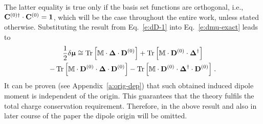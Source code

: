 \documentclass[aip,amsmath,amssymb,reprint,floatfix]{revtex4-1}
\newcommand{\BM}[1]{\bm{#1}}
\DeclareMathOperator{\Tr}{Tr}
\begin{document}
%
The latter equality is true only if the basis set functions are orthogonal, i.e., 
${\bf C}^{(0)\dagger} \cdot {\bf C}^{(0)}={\bf 1}$,
which will be the case throughout the entire work, unless stated otherwise.
Substituting the result from Eq.~\eqref{e:dD-1}
into Eq.~\eqref{e:dmu-exact} leads to
%
\begin{multline} \label{e:dmu-4-exact.linear-approximation}
 \frac{1}{2} 
 \delta {\BM{\upmu}}
  \cong
   \Tr{ 
    \left[ 
         {\mathbb{M}} \cdot {\BM\Delta} \cdot {\bf D}^{(0)}  
    \right] }
%
  +\Tr{ 
    \left[ 
         {\mathbb{M}} \cdot {\bf D}^{(0)} \cdot {\BM\Delta}^{\dagger}
    \right] } \\
%
  -\Tr{ 
    \left[ 
         {\mathbb{M}} \cdot {\bf D}^{(0)} \cdot {\BM\Delta} \cdot {\bf D}^{(0)}
    \right] }
%
  -\Tr{ 
    \left[ 
         {\mathbb{M}} \cdot {\bf D}^{(0)} \cdot {\BM\Delta}^{\dagger} \cdot {\bf D}^{(0)}
    \right] } \;.
\end{multline}
%
It can be proven (see Appendix~\ref{a:orig-dep}) that such obtained
induced dipole moment is independent of the origin. 
This guarantees that the theory fulfils the total charge conservation requirement.
Therefore,
in the above result and also in later course of the paper the dipole origin will be omitted. 
\end{document}
